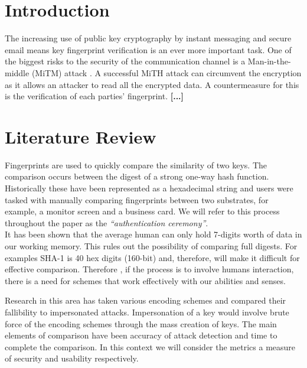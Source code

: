 \section{Introduction}
The increasing use of public key cryptography by instant messaging and secure email means key fingerprint 
verification is an ever more important task. One of the biggest risks to the security of the communication channel is a Man-in-the-middle (MiTM) attack . A successful MiTH attack can circumvent the encryption as it allows an attacker to read all the encrypted data. A countermeasure for this is the verification of each parties' fingerprint. \textbf{[...]}





\section{Literature Review}

Fingerprints are used to quickly compare the similarity of two keys. The comparison occurs between the digest of a strong one-way hash function. Historically these have been represented as a hexadecimal string and users were tasked with manually comparing fingerprints between two substrates, for example, a monitor screen and a business card. We will refer to this process throughout the paper as the \textit{``authentication ceremony''}. \\
It has been shown that the average human can only hold 7-digits worth of data in our working memory\cite{miller1956magical}. This rules out the possibility of comparing full digests. For examples SHA-1 is 40 hex digits (160-bit) and, therefore, will make it difficult for effective comparison. Therefore , if the  process is to involve humans interaction, there is a need for schemes that work effectively with our abilities and senses.

Research in this area has taken various encoding schemes and compared their fallibility to impersonated attacks. Impersonation of a key would involve brute force of the encoding schemes through the mass creation of keys. The main elements of comparison have been accuracy of attack detection and time to complete the comparison. In this context we will consider the metrics a measure of security and usability respectively.

